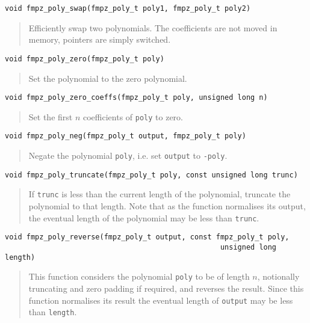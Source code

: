 \documentclass[a4paper,10pt]{article}
\newcommand{\code}{\lstinline}
\begin{document}
\begin{lstlisting}
void fmpz_poly_swap(fmpz_poly_t poly1, fmpz_poly_t poly2)
\end{lstlisting}
\begin{quote}
Efficiently swap two polynomials. The coefficients are not moved in memory, pointers are simply switched. \end{quote}

\begin{lstlisting}
void fmpz_poly_zero(fmpz_poly_t poly) 
\end{lstlisting}
\begin{quote}
Set the polynomial to the zero polynomial.
\end{quote}

\begin{lstlisting}
void fmpz_poly_zero_coeffs(fmpz_poly_t poly, unsigned long n) 
\end{lstlisting}
\begin{quote}
Set the first $n$ coefficients of \code{poly} to zero. 
\end{quote}

\begin{lstlisting}
void fmpz_poly_neg(fmpz_poly_t output, fmpz_poly_t poly) 
\end{lstlisting}
\begin{quote}
Negate the polynomial \code{poly}, i.e. set \code{output} to \code{-poly}.
\end{quote}

\begin{lstlisting}
void fmpz_poly_truncate(fmpz_poly_t poly, const unsigned long trunc)
\end{lstlisting}
\begin{quote}
If \code{trunc} is less than the current length of the polynomial, truncate the polynomial to that length. Note that as the function normalises its output, the eventual length of the polynomial may be less than \code{trunc}.
\end{quote}

\begin{lstlisting}
void fmpz_poly_reverse(fmpz_poly_t output, const fmpz_poly_t poly,  
                                                  unsigned long length) 
\end{lstlisting}
\begin{quote}
This function considers the polynomial \code{poly} to be of length $n$, notionally truncating and zero padding if required, and reverses the result. Since this function normalises its result the eventual length of \code{output} may be less than \code{length}.
\end{quote}
\end{document}
